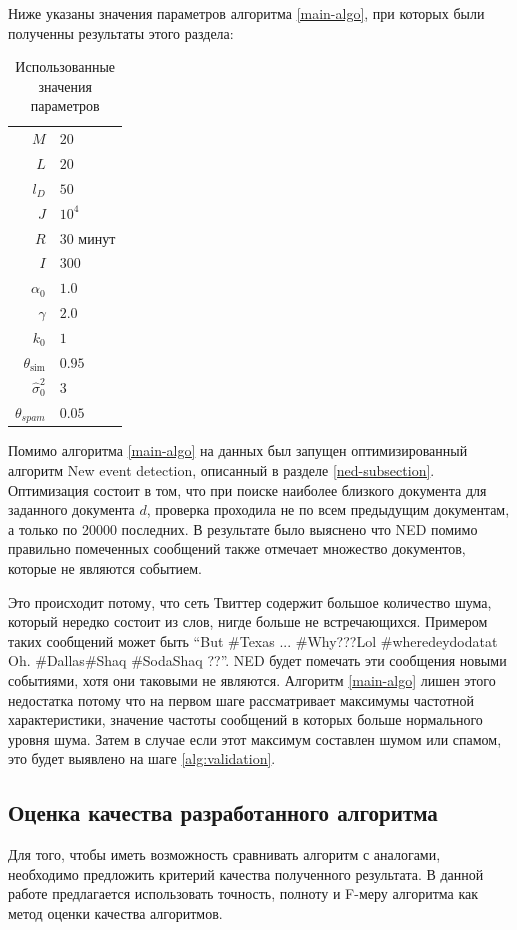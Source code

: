 \documentclass[14pt,a4paper,oneside]{extarticle}
\DeclareMathOperator{\simu}{sim}
\begin{document}
	Ниже указаны значения параметров алгоритма \ref{main-algo}, при которых были полученны результаты этого раздела:
	
	\begin{table}[H]
	\centering
	\caption{Использованные значения параметров}
	\begin{tabular}{r | l}
	$M$ & $20$ \\
	$L$ & $20$ \\
	$l_D$ & $50$ \\
	$J$ & $10^4$ \\
	$R$ & $30$ минут \\
	$I$ & $300$ \\
	$\alpha_0$ & $1.0$ \\
	$\gamma$ & $2.0$ \\
	$k_0$ & $1$ \\
	$\theta_{\simu}$ & $0.95$ \\
	$\hat{\sigma}_0^2$ & $3$ \\
	$\theta_{spam}$ & $0.05$ \\
	\end{tabular}
	
	\label{params-table}
	\end{table}
	
	Помимо алгоритма \ref{main-algo} на данных был запущен оптимизированный алгоритм New event detection, описанный в разделе \ref{ned-subsection}. Оптимизация состоит в том, что при поиске наиболее близкого документа для заданного документа $d$, проверка проходила не по всем предыдущим документам, а только по 20000 последних. В результате было выяснено что NED помимо правильно помеченных сообщений также отмечает множество документов, которые не являются событием.
	
	Это происходит потому, что сеть Твиттер содержит большое количество шума, который нередко состоит из слов, нигде больше не встречающихся. Примером таких сообщений может быть ``But \#Texas ... \#Why???Lol \#wheredeydodatat Oh. \#Dallas\#Shaq \#SodaShaq ??''. NED будет помечать эти сообщения новыми событиями, хотя они таковыми не являются. Алгоритм  \ref{main-algo} лишен этого недостатка потому что на первом шаге рассматривает максимумы частотной характеристики, значение частоты сообщений в которых больше нормального уровня шума. Затем в случае если этот максимум составлен шумом или спамом, это будет выявлено на шаге \ref{alg:validation}.
	
	\subsection{Оценка качества разработанного алгоритма}
	Для того, чтобы иметь возможность сравнивать алгоритм с аналогами, необходимо предложить критерий качества полученного результата. В данной работе предлагается использовать точность, полноту и F-меру алгоритма как метод оценки качества алгоритмов.
	
\end{document}
